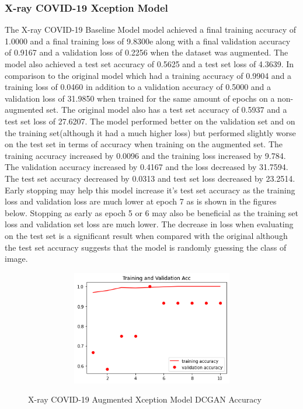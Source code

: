 \subsubsection{X-ray COVID-19 Xception Model}
The X-ray COVID-19 Baseline Model model achieved a final training accuracy of 1.0000 and a final training loss of 9.8300e along with a final validation accuracy of 0.9167 and a validation loss of 0.2256 when the dataset was augmented.  The model also achieved a test set accuracy of 0.5625 and a test set loss of 4.3639.  In comparison to the original model which had a training accuracy of 0.9904 and a training loss of 0.0460  in addition to a validation accuracy of 0.5000 and a validation loss of 31.9850 when trained for the same amount of epochs on a non-augmented set.  The original model also has a test set accuracy of 0.5937 and a test set loss of 27.6207.  The model performed better on the validation set and on the training set(although it had a much higher loss) but performed slightly worse on the test set in terms of accuracy when training on the augmented set.  The training accuracy increased by 0.0096 and the training loss increased by 9.784. The validation accuracy increased by 0.4167 and the loss decreased by 31.7594.  The test set accuracy decreased by 0.0313 and test set loss decreased by 23.2514.  Early stopping may help this model increase it's test set accuracy as the training loss and validation loss are much lower at epoch 7 as is shown in the figures below.  Stopping as early as epoch 5 or 6 may also be beneficial as the training set loss and validation set loss are much lower.  The decrease in loss when evaluating on the test set is a significant result when compared with the original although the test set accuracy suggests that the model is randomly guessing the class of image.
 \begin{figure}[H]
    \centering    \includegraphics[width=1\textwidth,height=5cm,keepaspectratio]{Images/XceptionBaselineTrainingValidationAccuracyXRayCOVID19AugmentedDCGAN.png}\\
    \caption{X-ray COVID-19 Augmented Xception Model DCGAN Accuracy}
    \label{fig:X-ray COVID-19 Augmented Xception Model DCGAN Accuracy}
\end{figure}
